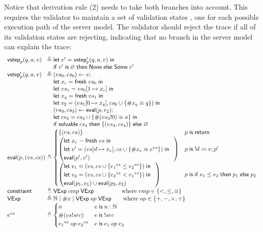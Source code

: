 Notice that derivation rule (2) needs to take both branches into account.  This
requires the validator to maintain a set of validation states , one for each
possible execution path of the server model.  The validator should reject the
trace if all of its validation states are rejecting, indicating that no branch
in the server model can explain the trace:
\[\begin{array}{l@{\;}r@{\;}l}
\vstep_p(q,a,v)&\triangleq&\letin{v'}{\vstep'_p(q,a,v)}\\
&&\If v'\Is\varnothing\Then\None\Else\Some v'\\
\vstep'_p(q,a,v)&\triangleq&(vs_0,cs_0)\gets v;\\
&&\letin{x_c}{\Fresh vs_0}\\
&&\letin{vs_1}{\update{vs_0}{1}{x_c}}\\
&&\letin{x_q}{\Fresh vs_1}\\
&&\letin{v_2}{(\update{vs_1}{0}{x_q},cs_0\cup\{\#x_q\equiv q\})}\\
&&(vs_3,cs_3)\gets\Eval(p,v_2);\\
&&\letin{cs_4}{cs_3\cup\{\#(vs_3!0)\equiv a\}}\\
&&\If\solvable cs_4\Then\{(vs_4,cs_4)\}\Else\varnothing\\
\Eval(p,(vs,cs))&\triangleq&\begin{cases}
  \{(vs,cs)\}&p\Is\Return\\
  \left(\begin{array}{@{}l}
    \letin{x_e}{\Fresh vs}\\
    \letin{v'}{(\update{vs}{d}{x_e},cs\cup\{\#x_e\equiv e^{vs}\})}\\
    \Eval(p',v')
  \end{array}\right)&p\Is !d\coloneqq e;p'\\
  \left(\begin{array}{@{}l}
    \letin{v_1}{(vs,cs\cup\{{e_1}^{vs}\le{e_2}^{vs}\})}\\
    \letin{v_2}{(vs,cs\cup\{{e_2}^{vs}<{e_1}^{vs}\})}\\
    \Eval(p_1,v_1)\cup\Eval(p_2,v_2)
  \end{array}\right)&p\Is\If e_1\le e_2\Then p_1\Else p_2
\end{cases}\\
\constraint&\triangleq&\Vexp\;cmp\;\Vexp\qquad\qquad\;\;\,\text{where }cmp\in\{<,\le,\equiv\}\\
\Vexp&\triangleq&\Nat\mid\#x\mid\Vexp\;op\;\Vexp\qquad\text{where }op\in\{+,-,\times,\div\}\\
e^{vs}&\triangleq&\begin{cases}
  n&e\Is n:\Nat\\
  \#(vs!src)&e\Is!src\\
  {e_1}^{vs}\;op\;{e_2}^{vs}&e\Is e_1\;op\;e_2
\end{cases}
\end{array}\]

